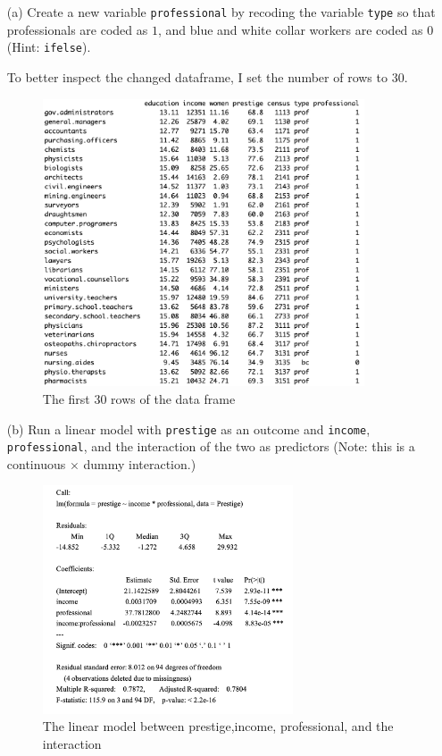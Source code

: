 \documentclass[12pt,letterpaper]{article}
\begin{document}
\newpage
\begin{enumerate}
	
	\item [(a)]
	Create a new variable \texttt{professional} by recoding the variable \texttt{type} so that professionals are coded as $1$, and blue and white collar workers are coded as $0$ (Hint: \texttt{ifelse}).
		
		To better inspect the changed dataframe, I set the number of rows to 30.\\
		\begin{figure}[h!]
			\caption{\footnotesize{The first 30 rows of the data frame}}
			\vspace{.2cm}
			\centering
			\label{fig:1.1}
			\includegraphics[width=0.9\textwidth]{Prestige.png}
		\end{figure}
	\vspace{15cm}
	\item [(b)]
	Run a linear model with \texttt{prestige} as an outcome and \texttt{income}, \texttt{professional}, and the interaction of the two as predictors (Note: this is a continuous $\times$ dummy interaction.)
	
	\begin{figure}[h!]
		\caption{\footnotesize{The linear model between prestige,income, professional, and the interaction}}
		\vspace{.2cm}
		\centering
		\label{fig:1.2}
		\includegraphics[width=0.7\textwidth]{summary.png}

\end{figure}
\end{enumerate}
\end{document}
